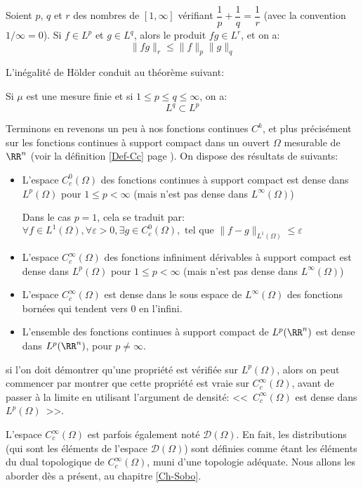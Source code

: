 \begin{theoreme}
Soient $p$, $q$ et $r$ des nombres de $[1,\infty]$ vérifiant
$\dfrac1p+\dfrac1q=\dfrac1r$ (avec la convention $1/\infty=0$).
Si $f\in L^p$ et $g\in L^q$, alors le produit $fg\in L^r$, et on a:
\begin{equation}\|fg\|_r\le\|f\|_p\|g\|_q\end{equation}
\end{theoreme}

L'inégalité de Hölder conduit au théorème suivant:
\begin{theoreme}
Si $\mu$ est une mesure finie et si $1\le p\le q\le \infty$, on a:
\begin{equation}L^q\subset L^p\end{equation}
\end{theoreme}

\medskip
Terminons en revenons un peu à nos fonctions continues $C^k$, et plus précisément sur les fonctions continues à support compact
dans un ouvert $\Omega$ mesurable de $\RR^n$ (voir la définition \ref{Def-Cc} page \pageref{Def-Cc}).
On dispose des résultats de  suivants:
\begin{itemize}
   \item L'espace $C_c^0(\Omega)$ des fonctions continues à support compact est dense dans $L^p(\Omega)$ pour $1\le p<\infty$
	(mais n'est pas dense dans $L^\infty(\Omega)$)

	 Dans le cas $p=1$, cela se traduit par: 	$  \forall f\in L^1(\Omega), \forall\varepsilon>0, \exists g\in C_ c^0(\Omega), \text{ tel que }
	   \|f-g\|_{L^1(\Omega)}\le\varepsilon$ 

   \item L'espace $C_c^\infty(\Omega)$ des fonctions infiniment dérivables à support compact est dense dans $L^p(\Omega)$ pour $1\le p<\infty$
	(mais n'est pas dense dans $L^\infty(\Omega)$)
   \item L'espace $C_c^\infty(\Omega)$ est dense dans le sous espace de $L^\infty(\Omega)$ des fonctions bornées qui tendent vers 0 en l'infini.
   \item L'ensemble des fonctions continues à support compact de $L^p(\RR^n)$ est dense dans $L^p(\RR^n)$, pour $ p\neq \infty$. 
\end{itemize}

si l'on doit démontrer qu'une propriété est vérifiée sur $L^p(\Omega)$, alors on peut commencer par montrer que cette propriété est 
vraie sur $C_c^\infty(\Omega)$, avant de passer à la limite en utilisant  l'argument de densité:
<<~$C_c^\infty(\Omega)$ est dense dans $L^p(\Omega)$~>>.

\medskip
L'espace $C_c^{\infty}(\Omega)$ est parfois également noté $\mathcal{D}(\Omega)$. 
En fait, les distributions (qui sont les éléments de l'espace $\mathcal{D}(\Omega)$) sont définies comme étant les éléments du 
dual topologique de $C_c^{\infty}(\Omega)$, muni d'une topologie adéquate.
Nous allons les aborder dès a présent, au chapitre \ref{Ch-Sobo}.
